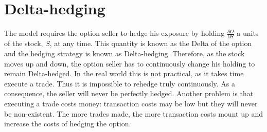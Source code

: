 \documentclass{book}
\begin{document}
\section{Delta-hedging}
The model requires the option seller to hedge his exposure by holding $\frac{\partial O}{\partial S}$ a units of the stock, $S$, at any time. This quantity is known as the Delta of the option and the hedging strategy is known as Delta-hedging. Therefore, as the stock moves up and down, the option seller has to continuously change his holding to remain Delta-hedged. In the real world this is not practical, as it takes time execute a trade. Thus it is impossible to rehedge truly continuously. As a consequence, the seller will never be perfectly hedged. Another problem is that executing a trade costs money: transaction costs may be low but they will never be non-existent. The more trades made, the more transaction costs mount up and increase the costs of hedging the option.
\end{document}
